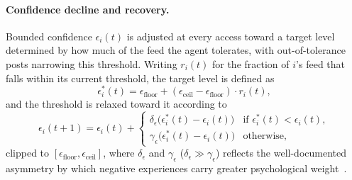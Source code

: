 \documentclass{svproc}
\def\BoundedConfidence{\epsilon} %
\begin{document}
\paragraph{Confidence decline and recovery.}
Bounded confidence $\BoundedConfidence_i(t)$ is adjusted at every
access toward a target level determined by how much of the feed the
agent tolerates, with out-of-tolerance posts narrowing this
threshold. Writing $r_i(t)$ for the fraction of $i$'s feed that falls
within its current threshold, the target level is defined as
%
\begin{equation} 
  \BoundedConfidence_i^{\ast}(t) =
  \BoundedConfidence_{\mathrm{floor}} + (\BoundedConfidence_{\mathrm{ceil}}-\BoundedConfidence_{\mathrm{floor}})\cdot r_i(t), 
\end{equation} 
%
and the threshold is relaxed toward it according to 
%
\begin{equation} 
  \BoundedConfidence_i(t{+}1) = \BoundedConfidence_i(t) +
  \begin{cases}
    \delta_{\BoundedConfidence}\!
    \big(\BoundedConfidence_i^{\ast}(t)-\BoundedConfidence_i(t)\big)
    & \text{if } \BoundedConfidence_i^{\ast}(t) <
    \BoundedConfidence_i(t), \\[2pt]
    \gamma_{\BoundedConfidence}\!
    \big(\BoundedConfidence_i^{\ast}(t)-\BoundedConfidence_i(t)\big)
      & \text{otherwise},
  \end{cases}\label{eq:bc}
\end{equation} 
%
clipped to
$[\BoundedConfidence_{\mathrm{floor}},\BoundedConfidence_{\mathrm{ceil}}]$,
where $\delta_{\BoundedConfidence}$ and $\gamma_{\BoundedConfidence}$
($\delta_{\BoundedConfidence}\gg\gamma_{\BoundedConfidence}$) reflects
the well-documented asymmetry by which negative experiences carry
greater psychological weight~\cite{baumeister2001}.
\par
\end{document}

